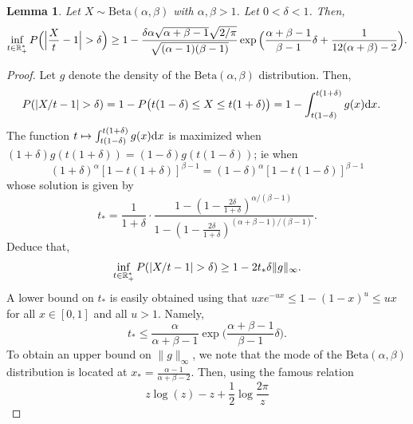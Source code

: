 \documentclass{article}
\newtheorem{lemma}{Lemma}
\newcommand{\1}{\boldsymbol{1}}
\newcommand{\betaDist}{\mathrm{Beta}}
\theoremstyle{plain}
\begin{document}
\begin{lemma}
  \label{lem:beta-bayes}
  Let $X \sim \betaDist(\alpha,\beta)$ with $\alpha,\beta > 1$. Let $0 < \delta< 1$. Then,
  \begin{equation*}
    \inf_{t\in \NNReals^{*}}P\Big(\Big|\frac{X}{t} - 1\Big| > \delta \Big)%
    \geq 1 - %
    \frac{\delta \alpha \sqrt{\alpha + \beta - 1} \sqrt{2/\pi}}{\sqrt{(\alpha-1)(\beta-1)}}%
    \exp\Big( \frac{\alpha + \beta-1}{\beta-1}\delta+ \frac{1}{12(\alpha + \beta)-2} \Big).
  \end{equation*}
\end{lemma}
\begin{proof}
  Let $g$ denote the density of the $\betaDist(\alpha,\beta)$ distribution. Then,
  \begin{align*}
    P(|X/t - 1| > \delta)%
    &= 1 - P\big( t(1 - \delta) \leq X \leq t(1+\delta) \big)%
    = 1 - \int_{t(1-\delta)}^{t(1+\delta)}g(x)\intd x.
  \end{align*}
  The function $t\mapsto \int_{t(1-\delta)}^{t(1+\delta)}g(x)\mathrm{d} x$ is maximized when $(1 + \delta)g(t(1+\delta)) = (1 - \delta)g(t(1-\delta))$; ie when
  \begin{equation*}
    (1+\delta)^{\alpha}[1-t(1+\delta)]^{\beta-1} = (1-\delta)^{\alpha}[1 - t(1-\delta)]^{\beta-1}
  \end{equation*}
  whose solution is given by
  \begin{equation*}
    t_{*} =\frac{1}{1+\delta}\cdot \frac{1 - (1 - \frac{2\delta}{1+\delta})^{\alpha/(\beta-1)}}{1 - (1 - \frac{2\delta}{1+\delta})^{(\alpha + \beta-1)/(\beta-1)}}.
  \end{equation*}
  Deduce that,
  \begin{equation*}
    \inf_{t\in \NNReals^{*}}P(|X/t - 1| > \delta)%
    \geq 1 - 2t_{*}\delta \|g\|_{\infty}.
  \end{equation*}
  A lower bound on $t_{*}$ is easily obtained using that $u xe^{-ux} \leq 1 - (1-x)^u \leq ux$ for all $x \in [0,1]$ and all $u > 1$. Namely,
  \begin{equation*}
    t_{*}%
    \leq \frac{\alpha}{\alpha + \beta - 1}\exp\Big( \frac{\alpha + \beta - 1}{\beta-1}\delta \Big).
  \end{equation*}
  To obtain an upper bound on $\|g\|_{\infty}$, we note that the mode of the $\betaDist(\alpha,\beta)$ distribution is located at $x_{*} = \frac{\alpha-1}{\alpha + \beta - 2}$. Then, using the famous relation  \cite[Section~3.6]{Tem(96)}
  \begin{equation*}
    z\log(z) - z + \frac{1}{2}\log\frac{2\pi}{z}%

\end{equation*}
\end{proof}
\end{document}
